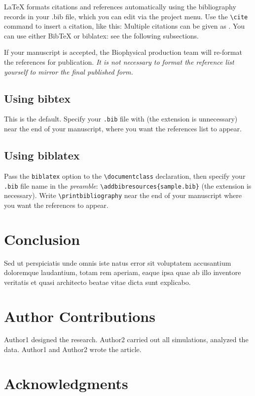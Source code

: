 \documentclass{biophys-new}
\begin{document}
\LaTeX{} formats citations and references automatically using the bibliography records in your .bib file, which you can edit via the project menu. Use the \verb|\cite| command to insert a citation, like this: \cite{Chen_Nicholson00} Multiple citations can be given as \cite{Stiles_Bartol01,el-Kareh_etal93,Callaghan91}. You can use either BibTeX or biblatex: see the following subsections.

If your manuscript is accepted, the Biophysical production team will re-format the references for publication. \emph{It is not necessary to format the reference list yourself to mirror the final published form.}

\subsection*{Using bibtex} 
This is the default. Specify your \texttt{.bib} file with \verb|| (the extension is unnecessary) near the end of your manuscript, where you want the references list to appear.

\subsection*{Using biblatex} 
Pass the \texttt{biblatex} option to the \verb|\documentclass| declaration, then specify your \texttt{.bib} file name in the \emph{preamble}: \verb|\addbibresources{sample.bib}| (the extension is necessary). Write \verb|\printbibliography| near the end of your manuscript where you want the references to appear.

\section*{Conclusion}

Sed ut perspiciatis unde omnis iste natus error sit voluptatem accusantium doloremque laudantium, totam rem aperiam, eaque ipsa quae ab illo inventore veritatis et quasi architecto beatae vitae dicta sunt explicabo. 

\section*{Author Contributions}

Author1 designed the research. Author2 carried out all simulations, analyzed the data. Author1 and Author2 wrote the article. 

\section*{Acknowledgments}
\end{document}
